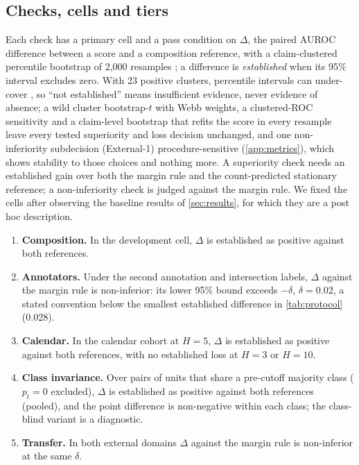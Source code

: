 \documentclass[11pt]{article}
\begin{document}
\subsection{Checks, cells and tiers}
Each check has a primary cell and a pass condition on $\Delta$, the paired AUROC difference between
a score and a composition reference, with a claim-clustered percentile bootstrap of 2{,}000
resamples \citep{EfronTibshirani1993}; a difference is \emph{established} when its 95\%
interval excludes zero. With 23 positive clusters, percentile intervals can under-cover
\citep{Cameron2008}, so ``not established'' means insufficient evidence, never evidence of absence;
a wild cluster bootstrap-$t$ with Webb weights, a clustered-ROC sensitivity and a claim-level
bootstrap that refits the score in every resample leave every tested superiority and loss decision
unchanged, and one non-inferiority subdecision (External-1) procedure-sensitive
(\cref{app:metrics}), which shows stability to those choices and nothing more. A superiority check needs an established gain over both
the margin rule and the count-predicted stationary reference; a non-inferiority check is judged against the margin rule. We fixed the cells after observing the baseline results of
\cref{sec:results}, for which they are a post hoc description.
\begin{enumerate}[leftmargin=*,nosep,label=\arabic*.]
\item \textbf{Composition.} In the development cell, $\Delta$ is established as positive against both references.
\item \textbf{Annotators.} Under the second annotation and intersection labels, $\Delta$ against the margin rule is non-inferior: its lower 95\% bound exceeds $-\delta$, $\delta=0.02$, a stated convention below the smallest established difference in \cref{tab:protocol} (0.028).
\item \textbf{Calendar.} In the calendar cohort at $H=5$, $\Delta$ is established as positive against both references, with no established loss at $H=3$ or $H=10$.
\item \textbf{Class invariance.} Over pairs of units that share a pre-cutoff majority class ($p_t=0$ excluded), $\Delta$ is established as positive against both references (pooled), and the point difference is non-negative within each class; the class-blind variant is a diagnostic.
\item \textbf{Transfer.} In both external domains $\Delta$ against the margin rule is non-inferior at the same $\delta$.
\end{enumerate}
\end{document}
